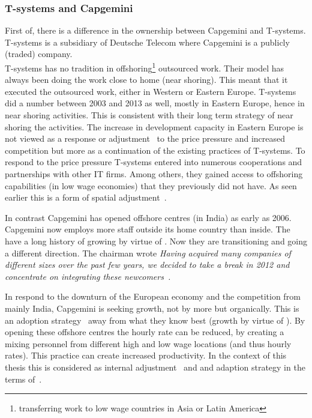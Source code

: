 \subsubsection{T-systems and Capgemini}
First of, there is a difference in the ownership between Capgemini and T-systems.
T-systems is a subsidiary of Deutsche Telecom where Capgemini is a publicly (traded) company.\\
T-systems has no tradition in offshoring\footnote{transferring work to low wage countries in Asia or Latin America} outsourced work.  
Their model has always been doing the work close to home (near shoring).
This meant that it executed the outsourced work, either in Western or Eastern Europe. 
T-systems did a number \acqs between 2003 and 2013 as well, mostly in Eastern Europe, hence in near shoring activities.
This is consistent with their long term strategy of near shoring the activities.
The increase in development capacity in Eastern Europe is not viewed as a response or adjustment~\citep{Lawton:2009vw} to the price pressure and increased competition but more as a continuation of the existing practices of T-systems.
To respond to the price pressure T-systems entered into numerous cooperations and partnerships with other IT firms. 
Among others, they gained access to offshoring capabilities (in low wage economies) that they previously did not have.
As seen earlier this is a form of spatial adjustment~\citep{Lawton:2009vw}.

In contrast Capgemini has opened offshore centres (in India) as early as 2006.
Capgemini now employs more staff outside its home country than inside.
The have a long history of growing by virtue of \acqs.
Now they are transitioning and going a different direction.
The chairman wrote \emph{Having acquired many companies of different sizes over the past few years, we decided to take a break in 2012 and concentrate on integrating these newcomers~\citep{Capgemini:2013}.}

In respond to the downturn of the European economy and the competition from mainly India, Capgemini is seeking growth, not by more \acqs but organically.
This is an adoption strategy~\cite{Cantwell:2009hg} away from what they know best (growth by virtue of \acq). 
By opening these offshore centres the hourly rate can be reduced, by creating a mixing personnel from different high and low wage locations (and thus hourly rates).
This practice can create increased productivity.
In the context of this thesis this is considered as internal adjustment~\cite{Lawton:2009vw} and and adaption strategy in the terms of~\cite{Cantwell:2009hg}.

